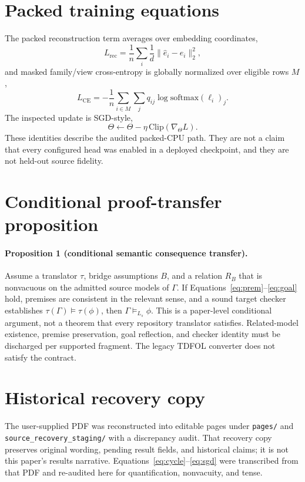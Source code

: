 \documentclass{article}
\begin{document}
\section{Packed training equations}
\label{app:packed}
The packed reconstruction term averages over embedding coordinates,
\begin{equation}
L_{\mathrm{rec}}=\frac1n\sum_i\frac1d\|\hat e_i-e_i\|_2^2,
\label{eq:rec}
\end{equation}
and masked family/view cross-entropy is globally normalized over eligible rows $M$,
\begin{equation}
L_{\mathrm{CE}}=-\frac1n\sum_{i\in M}\sum_j q_{ij}\log\mathrm{softmax}(\ell_i)_j.
\label{eq:ce}
\end{equation}
The inspected update is SGD-style,
\begin{equation}
\Theta\leftarrow\Theta-\eta\,\mathrm{Clip}(\nabla_\Theta L).
\label{eq:sgd}
\end{equation}
These identities describe the audited packed-CPU path. They are not a claim that every configured head was enabled in a deployed checkpoint, and they are not held-out source fidelity.

\section{Conditional proof-transfer proposition}
\label{app:prop}
\paragraph{Proposition 1 (conditional semantic consequence transfer).}
\label{prop:transfer}
Assume a translator $\tau$, bridge assumptions $B$, and a relation $R_B$ that is nonvacuous on the admitted source models of $\Gamma$. If Equations~\ref{eq:prem}--\ref{eq:goal} hold, premises are consistent in the relevant sense, and a sound target checker establishes $\tau(\Gamma)\models\tau(\phi)$, then $\Gamma\models_{L_s}\phi$.
This is a paper-level conditional argument, not a theorem that every repository translator satisfies. Related-model existence, premise preservation, goal reflection, and checker identity must be discharged per supported fragment. The legacy TDFOL converter does not satisfy the contract.

\section{Historical recovery copy}
\label{app:recovery}
The user-supplied PDF was reconstructed into editable pages under \texttt{pages/} and \texttt{source\_recovery\_staging/} with a discrepancy audit. That recovery copy preserves original wording, pending result fields, and historical claims; it is not this paper's results narrative. Equations~\ref{eq:cycle}--\ref{eq:sgd} were transcribed from that PDF and re-audited here for quantification, nonvacuity, and tense.


\newpage
{}

\end{document}
